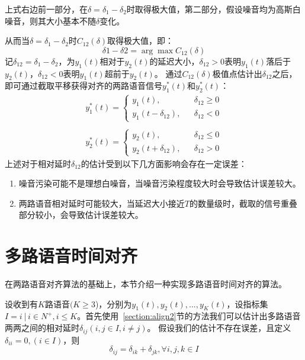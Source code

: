 上式右边前一部分，在$\delta=\delta_1-\delta_2$时取得极大值，第二部分，假设噪音均为高斯白噪音，则其大小基本不随$\delta$变化。

从而当$\delta=\delta_1-\delta_2$时$C_{12}(\delta)$取得极大值，即：
\begin{equation}
\delta1 - \delta2 = \arg \max C_{12}(\delta)
\end{equation}
记$\delta_{12}=\delta_1-\delta_2$，为$y_1 (t)$相对于$y_2 (t)$的延迟大小，$\delta_{12}>0$表明$y_1(t)$落后于$y_2(t)$，$\delta_{12}<0$表明$y_1(t)$超前于$y_2(t)$。
通过$C_{12}(\delta)$极值点估计出$\delta_{12}$之后，即可通过截取平移获得对齐的两路语音信号$y_1^*(t)$和$y_2^*(t)$：
\begin{equation}
    \begin{array}{l}
        y_1^*(t)=  \left\{ 
            \begin{array}{rcl}
            y_1(t), && {\delta_{12} \geq 0} \\
            y_1(t-\delta_{12}), && {\delta_{12} < 0}
            \end{array}
        \right. \\
        \\
        y_2^*(t)= \left\{ 
            \begin{array}{rcl}
            y_2(t), && {\delta_{12} \leq 0} \\
            y_2(t+\delta_{12}), && {\delta_{12} > 0}
            \end{array}
        \right.
    \end{array}
\end{equation}
上述对于相对延时$δ_{12}$的估计受到以下几方面影响会存在一定误差：
\begin{enumerate}
\item 噪音污染可能不是理想白噪音，当噪音污染程度较大时会导致估计误差较大。
\item 两路语音相对延时可能较大，当延迟大小接近$T$的数量级时，截取的信号重叠部分较小，会导致估计误差较大。
\end{enumerate}


\section{多路语音时间对齐} \label{section:align-multi}

在两路语音对齐算法的基础上，本节介绍一种实现多路语音时间对齐的算法。

设收到有$K$路语音$(K\geq3$)，分别为$y_1(t), y_2(t), ..., y_K(t)$，设指标集$I={i│i\in N^+, i\leq K}$。首先使用~\ref{section:align2}节的方法我们可以估计出多路语音两两之间的相对延时$\delta_{ij}  (i,j\in I,i\neq j)$。
假设我们的估计不存在误差，且定义$\delta_{ii}=0,(i \in I)$，则
\begin{equation}\label{eq:delay-relations}
\delta_{ij}=\delta_{ik}+\delta_{jk}, \forall i,j,k \in I
\end{equation}


